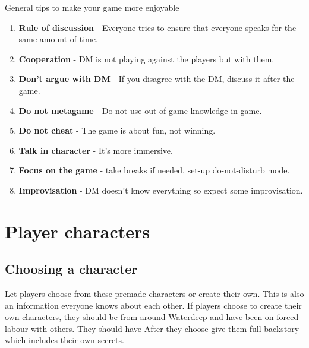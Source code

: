 \documentclass[10pt,twoside,twocolumn,openany,nodepracetedcode]{dndbook}
\begin{document}
\begin{DndComment}{General tips to make your game more enjoyable}
  \begin{enumerate}
    \item \textbf{Rule of discussion} - Everyone tries to ensure that everyone speaks for the same amount of time.
    \item \textbf{Cooperation} - DM is not playing against the players but with them.
    \item \textbf{Don't argue with DM} - If you disagree with the DM, discuss it after the game.
    \item \textbf{Do not metagame} - Do not use out-of-game knowledge in-game.
    \item \textbf{Do not cheat} - The game is about fun, not winning.
    \item \textbf{Talk in character} - It's more immersive.
    \item \textbf{Focus on the game} - take breaks if needed, set-up do-not-disturb mode.
    \item \textbf{Improvisation} - DM doesn't know everything so expect some improvisation.
  \end{enumerate}
\end{DndComment}



\chapter{Player characters}
\section{Choosing a character}
Let players choose from these premade characters or create their own. This is also an information everyone knows about each other.
If players choose to create their own characters, they should be from around Waterdeep and have been on forced labour with others.
They should have
After they choose give them full backstory which includes their own secrets.
\end{document}

